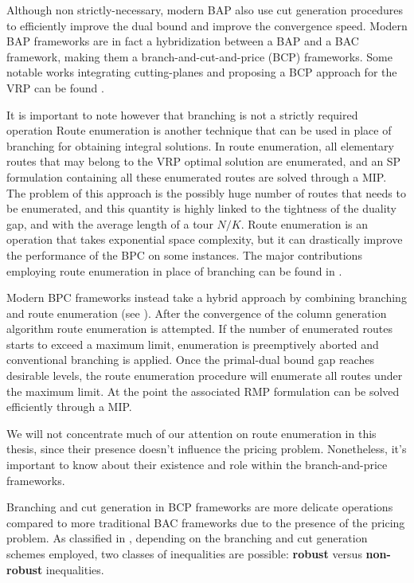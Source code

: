 Although non strictly-necessary, modern BAP also use
cut generation procedures to efficiently improve the dual bound and improve the convergence speed.
Modern BAP frameworks
are in fact a hybridization between a BAP and a BAC framework,
making them a branch-and-cut-and-price (BCP) frameworks.
Some notable works integrating cutting-planes and proposing
a BCP approach for the VRP can be found \textcite{fukasawa2006, ropke2012}.

\medskip

It is important to note however that branching is not a strictly required operation
Route enumeration is another technique that can be used in place of branching
for obtaining integral solutions.
In route enumeration, all elementary routes that may belong to the VRP optimal solution are enumerated,
and an SP formulation containing all these enumerated routes are solved through a MIP.
The problem of this approach is the possibly huge number of routes that needs to be enumerated,
and this quantity is highly linked to the tightness of the duality gap,
and with the average length of a tour $N / K$.
Route enumeration is an operation that takes exponential space complexity,
but it can drastically improve the performance of the BPC on some instances.
The major contributions employing route enumeration in place of branching can be found in
\textcite{baldacci2008, baldacci2011, contardo2014}.

Modern BPC frameworks instead take a hybrid approach by combining branching and route enumeration
(see \cite{pessoa2008, pessoa2009, pecin2017, pessoa2020}).
After the convergence of the column generation algorithm route enumeration is attempted.
If the number of enumerated routes starts to exceed a maximum limit, enumeration
is preemptively aborted and conventional branching is applied.
Once the primal-dual bound gap reaches desirable levels, the route enumeration
procedure will enumerate all routes under the maximum limit.
At the point the associated RMP formulation can be solved efficiently through a MIP.

We will not concentrate much of our attention on route enumeration in this
thesis, since their presence doesn't influence the pricing problem.
Nonetheless, it's important to know about their existence and role within
the branch-and-price frameworks.

\medskip

Branching and cut generation in BCP frameworks are more delicate operations
compared to more traditional BAC frameworks due to the presence of the pricing problem.
As classified in \textcite{dearagao2003},
depending on the branching and cut generation schemes employed,
two classes of inequalities are possible:
\textbf{robust} versus \textbf{non-robust} inequalities.

